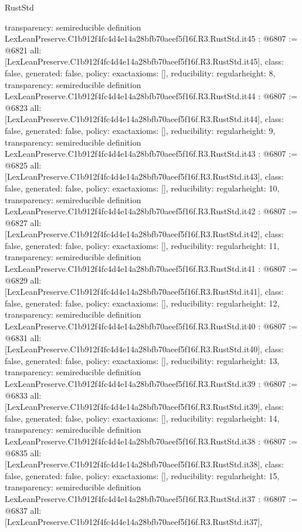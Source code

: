 \begin{lexlean}{RustStd}
\begin{coremodule}
{  transparency: semireducible
}
definition LexLeanPreserve.C1b912f4fc4d4e14a28bfb70aeef5f16f.R3.RustStd.it45 : @6807 := @6821 {
  all: [LexLeanPreserve.C1b912f4fc4d4e14a28bfb70aeef5f16f.R3.RustStd.it45],
  class: false,
  generated: false,
  policy: exact{axioms: []},
  reducibility: regular{height: 8},
  transparency: semireducible
}
definition LexLeanPreserve.C1b912f4fc4d4e14a28bfb70aeef5f16f.R3.RustStd.it44 : @6807 := @6823 {
  all: [LexLeanPreserve.C1b912f4fc4d4e14a28bfb70aeef5f16f.R3.RustStd.it44],
  class: false,
  generated: false,
  policy: exact{axioms: []},
  reducibility: regular{height: 9},
  transparency: semireducible
}
definition LexLeanPreserve.C1b912f4fc4d4e14a28bfb70aeef5f16f.R3.RustStd.it43 : @6807 := @6825 {
  all: [LexLeanPreserve.C1b912f4fc4d4e14a28bfb70aeef5f16f.R3.RustStd.it43],
  class: false,
  generated: false,
  policy: exact{axioms: []},
  reducibility: regular{height: 10},
  transparency: semireducible
}
definition LexLeanPreserve.C1b912f4fc4d4e14a28bfb70aeef5f16f.R3.RustStd.it42 : @6807 := @6827 {
  all: [LexLeanPreserve.C1b912f4fc4d4e14a28bfb70aeef5f16f.R3.RustStd.it42],
  class: false,
  generated: false,
  policy: exact{axioms: []},
  reducibility: regular{height: 11},
  transparency: semireducible
}
definition LexLeanPreserve.C1b912f4fc4d4e14a28bfb70aeef5f16f.R3.RustStd.it41 : @6807 := @6829 {
  all: [LexLeanPreserve.C1b912f4fc4d4e14a28bfb70aeef5f16f.R3.RustStd.it41],
  class: false,
  generated: false,
  policy: exact{axioms: []},
  reducibility: regular{height: 12},
  transparency: semireducible
}
definition LexLeanPreserve.C1b912f4fc4d4e14a28bfb70aeef5f16f.R3.RustStd.it40 : @6807 := @6831 {
  all: [LexLeanPreserve.C1b912f4fc4d4e14a28bfb70aeef5f16f.R3.RustStd.it40],
  class: false,
  generated: false,
  policy: exact{axioms: []},
  reducibility: regular{height: 13},
  transparency: semireducible
}
definition LexLeanPreserve.C1b912f4fc4d4e14a28bfb70aeef5f16f.R3.RustStd.it39 : @6807 := @6833 {
  all: [LexLeanPreserve.C1b912f4fc4d4e14a28bfb70aeef5f16f.R3.RustStd.it39],
  class: false,
  generated: false,
  policy: exact{axioms: []},
  reducibility: regular{height: 14},
  transparency: semireducible
}
definition LexLeanPreserve.C1b912f4fc4d4e14a28bfb70aeef5f16f.R3.RustStd.it38 : @6807 := @6835 {
  all: [LexLeanPreserve.C1b912f4fc4d4e14a28bfb70aeef5f16f.R3.RustStd.it38],
  class: false,
  generated: false,
  policy: exact{axioms: []},
  reducibility: regular{height: 15},
  transparency: semireducible
}
definition LexLeanPreserve.C1b912f4fc4d4e14a28bfb70aeef5f16f.R3.RustStd.it37 : @6807 := @6837 {
  all: [LexLeanPreserve.C1b912f4fc4d4e14a28bfb70aeef5f16f.R3.RustStd.it37],
}
\end{coremodule}
\end{lexlean}
